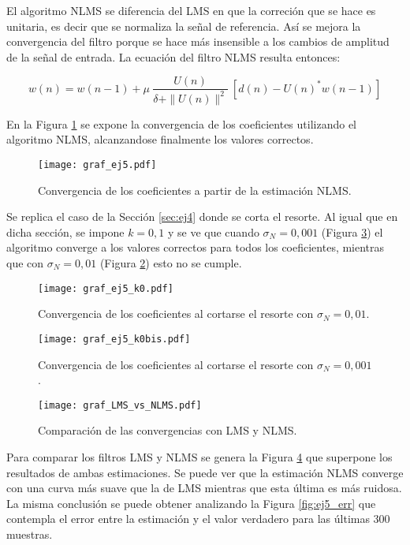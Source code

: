 
	El algoritmo NLMS se diferencia del LMS en que la correción que se hace es unitaria, es decir que se normaliza la señal de referencia. Así se mejora la convergencia del filtro porque se hace más insensible a los cambios de amplitud de la señal de entrada. La ecuación del filtro NLMS resulta entonces: 

	\begin{equation*}
		w(n) = w(n - 1) + \mu \> \frac{U(n)}{\delta + \|U(n)\|^2} \> [d(n) - U(n)^* w(n - 1)]
	\end{equation*}

	
	En la Figura \ref{fig:ej5} se expone la convergencia de los coeficientes utilizando el algoritmo NLMS, alcanzandose finalmente los valores correctos.
	\begin{figure}[h!]
		\centering
		\texttt{[image: graf\_ej5.pdf]}
		\caption{Convergencia de los coeficientes a partir de la estimación NLMS.}
		\label{fig:ej5}
	\end{figure}

	Se replica el caso de la Sección \ref{sec:ej4} donde se corta el resorte. Al igual que en dicha sección, se impone $k=0,1$ y se ve que cuando $\sigma_N=0,001$ (Figura \ref{fig:ej5_k01}) el algoritmo converge a los valores correctos para todos los coeficientes, mientras que con $\sigma_N=0,01$ (Figura \ref{fig:ej5_k0}) esto no se cumple. 
	
	\begin{figure}[h!]
		\centering
		\texttt{[image: graf\_ej5\_k0.pdf]}
		\caption{Convergencia de los coeficientes al cortarse el resorte con $\sigma_N=0,01$.}
		\label{fig:ej5_k0}
	\end{figure}
	
	\begin{figure}[h!]
		\centering
		\texttt{[image: graf\_ej5\_k0bis.pdf]}
		\caption{Convergencia de los coeficientes al cortarse el resorte con $\sigma_N=0,001$.}
		\label{fig:ej5_k01}
	\end{figure}

	\pagebreak

	\begin{figure}[h!]
		\centering
		\texttt{[image: graf\_LMS\_vs\_NLMS.pdf]}
		\caption{Comparación de las convergencias con LMS y NLMS.}
		\label{fig:ej5_comp}
	\end{figure}

	Para comparar los filtros LMS y NLMS se genera la Figura \ref{fig:ej5_comp} que superpone los resultados de ambas estimaciones. Se puede ver que la estimación NLMS converge con una curva más suave que la de LMS mientras que esta última es más ruidosa. La misma conclusión se puede obtener analizando la Figura \ref{fig:ej5_err} que contempla el error entre la estimación y el valor verdadero para las últimas 300 muestras.

